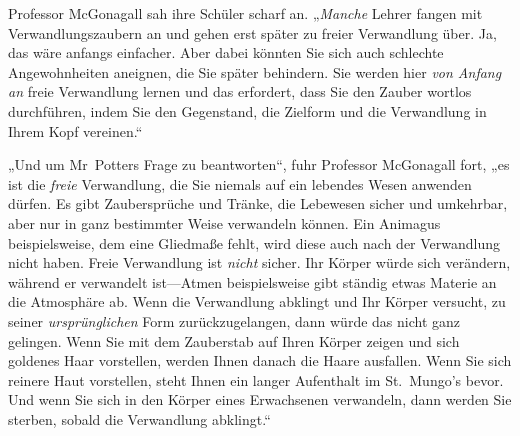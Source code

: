 Professor McGonagall sah ihre Schüler scharf an. „\emph{Manche} Lehrer fangen mit Verwandlungszaubern an und gehen erst später zu freier Verwandlung über. Ja, das wäre anfangs einfacher. Aber dabei könnten Sie sich auch schlechte Angewohnheiten aneignen, die Sie später behindern. Sie werden hier \emph{von Anfang an} freie Verwandlung lernen und das erfordert, dass Sie den Zauber wortlos durchführen, indem Sie den Gegenstand, die Zielform und die Verwandlung in Ihrem Kopf vereinen.“

„Und um Mr~Potters Frage zu beantworten“, fuhr Professor McGonagall fort, „es ist die \emph{freie} Verwandlung, die Sie niemals auf ein lebendes Wesen anwenden dürfen. Es gibt Zaubersprüche und Tränke, die Lebewesen sicher und umkehrbar, aber nur in ganz bestimmter Weise verwandeln können. Ein Animagus beispielsweise, dem eine Gliedmaße fehlt, wird diese auch nach der Verwandlung nicht haben. Freie Verwandlung ist \emph{nicht} sicher. Ihr Körper würde sich verändern, während er verwandelt ist—Atmen beispielsweise gibt ständig etwas Materie an die Atmosphäre ab. Wenn die Verwandlung abklingt und Ihr Körper versucht, zu seiner \emph{ursprünglichen} Form zurückzugelangen, dann würde das nicht ganz gelingen. Wenn Sie mit dem Zauberstab auf Ihren Körper zeigen und sich goldenes Haar vorstellen, werden Ihnen danach die Haare ausfallen. Wenn Sie sich reinere Haut vorstellen, steht Ihnen ein langer Aufenthalt im St.~Mungo’s bevor. Und wenn Sie sich in den Körper eines Erwachsenen verwandeln, dann werden Sie sterben, sobald die Verwandlung abklingt.“

